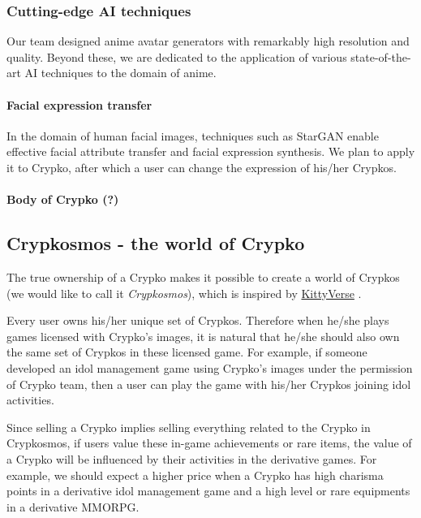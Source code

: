 \documentclass[b5paper]{article}
\begin{document}
\subsubsection{Cutting-edge AI techniques}

Our team designed anime avatar generators with remarkably high resolution and quality. Beyond these, we are dedicated to the application of various state-of-the-art AI techniques to the domain of anime.

\paragraph{Facial expression transfer}

In the domain of human facial images, techniques such as StarGAN \cite{choi2017stargan} enable effective facial attribute transfer and facial expression synthesis. 
We plan to apply it to Crypko, after which a user can change the expression of his/her Crypkos.

\paragraph{Body of Crypko (?)}

\subsection{Crypkosmos - the world of Crypko}

The true ownership of a Crypko makes it possible to create a world of Crypkos (we would like to call it \emph{Crypkosmos}), which is inspired by \href{https://www.cryptokitties.co/kittyverse}{KittyVerse} \cite{cryptokitties}. 

Every user owns his/her unique set of Crypkos. 
Therefore when he/she plays games licensed with Crypko's images, it is natural that he/she should also own the same set of Crypkos in these licensed game. 
For example, if someone developed an idol management game using Crypko's images under the permission of Crypko team, then a user can play the game with his/her Crypkos joining idol activities.

Since selling a Crypko implies selling everything related to the Crypko in Crypkosmos, 
if users value these in-game achievements or rare items, 
the value of a Crypko will be influenced by their activities in the derivative games. 
For example, we should expect a higher price when a Crypko has high charisma points in a derivative idol management game and a high level or rare equipments in a derivative MMORPG.
\end{document}
